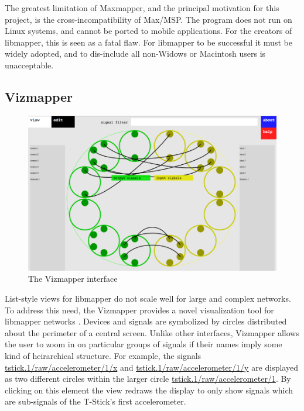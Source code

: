 The greatest limitation of Maxmapper, and the principal motivation for this project, is the cross-incompatibility of Max/MSP. The program does not run on Linux systems, and cannot be ported to mobile applications. For the creators of libmapper, this is seen as a fatal flaw. For libmapper to be successful it must be widely adopted, and to dis-include all non-Widows or Macintosh users is unacceptable.

	\subsection{Vizmapper} %
	\label{sub:vizmapper}

\begin{figure}[ht]
	\centering
	\includegraphics[width=\textwidth]{figures/vizmapper2}
	\caption{The Vizmapper interface}
	\label{fig:vizmapper}
\end{figure}

List-style views for libmapper do not scale well for large and complex networks. To address this need, the Vizmapper provides a novel visualization tool for libmapper networks \cite{vizmapper}. Devices and signals are symbolized by circles distributed about the perimeter of a central screen. Unlike other interfaces, Vizmapper allows the user to zoom in on particular groups of signals if their names imply some kind of heirarchical structure. For example, the signals \url{tstick.1/raw/accelerometer/1/x} and \url{tstick.1/raw/accelerometer/1/y} are displayed as two different circles within the larger circle \url{tstick.1/raw/accelerometer/1}. By clicking on this element the view redraws the display to only show signals which are sub-signals of the T-Stick's first accelerometer. 

